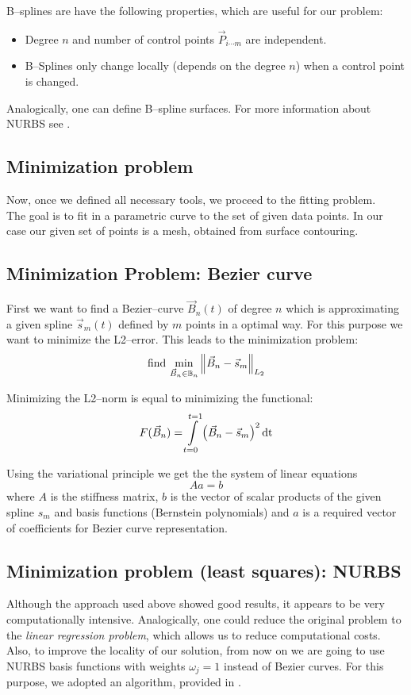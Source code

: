 B--splines are have the following properties, which are useful for our problem:
\begin{itemize}
\item Degree $n$ and number of control points $\vec{P}_{i\cdots m}$ are independent.
\item B--Splines only change locally (depends on the degree $n$) when a control point is changed.
\end{itemize}

Analogically, one can define B--spline surfaces. For more information about NURBS see \cite{farin1999nurbs}.
\subsection{Minimization problem}
Now, once we defined all necessary tools, we proceed to the fitting problem.\\
The goal is to fit in a parametric curve to the set of given data points. In our case our given set of points is a mesh, obtained from surface contouring.
\subsection{Minimization Problem: Bezier curve}
First we want to find a Bezier--curve $\vec{B}_n\left(t\right)$ of degree $n$ which is approximating a given spline $\vec{s}_m\left(t\right)$ defined by $m$ points in a optimal way. For this purpose we want to minimize the L2--error. This leads to the minimization problem:
\begin{equation}
\text{find\ } \underset{\vec{B}_n\in \mathbb{B}_n}{\min} \Ltwonorm{\vec{B}_n-\vec{s}_m}
\end{equation}

Minimizing the L2--norm is equal to minimizing the functional:
\begin{equation}
F(\vec{B}_n)=\int\limits_{t=0}^{t=1} \left(\vec{B}_n-\vec{s}_m\right)^2\dt
\end{equation}

Using the variational principle we get the the system of linear equations
\begin{equation}
A a = b
\end{equation}
where $A$ is the stiffness matrix, $b$ is the vector of scalar products of the given spline $s_{m}$ and basis functions (Bernstein polynomials) and $a$ is a required vector of coefficients for Bezier curve representation.

\subsection{Minimization problem (least squares): NURBS}
Although the approach used above showed good results, it appears to be very computationally intensive. Analogically, one could reduce the original problem to the \textit{linear regression problem}, which allows us to reduce computational costs. Also, to improve the locality of our solution, from now on we are going to use NURBS basis functions with weights $\omega_{j} = 1$ instead of Bezier curves. For this purpose, we adopted an algorithm, provided in \cite{becker2011advanced}.


